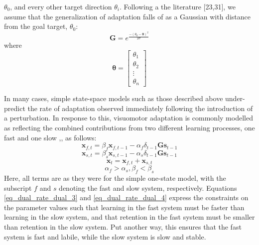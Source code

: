 \documentclass[jou, 11pt, longtable, floatsintext, notab]{apa6}
\begin{document}
$\theta_{0}$, and every other target direction $\theta_{i}$.
Following a the literature [23,31], we assume that the
generalization of adaptation falls of as a Gaussian with
distance from the goal target, $\theta_{0}$:
\begin{equation}
  \boldsymbol{G} = e^{\frac{-(\theta_{0} - \boldsymbol{\theta})^2}{2 \sigma}}
\end{equation}
where
\begin{equation}
\boldsymbol{\theta} = \begin{bmatrix} \theta_1 \\ \theta_2 \\ \vdots \\ \theta_n \end{bmatrix}
\end{equation}

In many cases, simple state-space models such as those
described above under-predict the rate of adaptation
observed immediately following the introduction of a
perturbation. In response to this, visuomotor adaptation is
commonly modelled as reflecting the combined contributions
from two different learning processes, one fast and one slow
\cite{smith_interacting_2006},\cite{mcdougle_taking_2016},
as follows:
\begin{equation}
  \boldsymbol{x}_{f, t} = \beta_{f} \boldsymbol{x}_{f,
    t-1} - \alpha_{f} \delta_{t-1} \boldsymbol{G} \boldsymbol{s}_{t-1}
  \label{eq_dual_rate_dual_1}
\end{equation}
\begin{equation}
    \boldsymbol{x}_{s, t} = \beta_{s} \boldsymbol{x}_{s,
      t-1} - \alpha_{s} \delta_{t-1} \boldsymbol{G} \boldsymbol{s}_{t-1}
    \label{eq_dual_rate_dual_2}
\end{equation}
\begin{equation}
  \boldsymbol{x}_{t} = \boldsymbol{x}_{f, t} + \boldsymbol{x}_{s, t}
  \label{eq_dual_rate_dual_3}
\end{equation}
\begin{equation}
  \alpha_{f} > \alpha_{s}, \beta_{f} < \beta_{s}
  \label{eq_dual_rate_dual_4}
\end{equation}
Here, all terms are as they were for the simple one-state
model, with the subscript $f$ and $s$ denoting the fast and
slow system, respectively. Equations
\ref{eq_dual_rate_dual_3} and \ref{eq_dual_rate_dual_4}
express the constraints on the parameter values such that
learning in the fast system must be faster than learning in
the slow system, and that retention in the fast system must
be smaller than retention in the slow system. Put another
way, this ensures that the fast system is fast and labile,
while the slow system is slow and stable.
\end{document}
